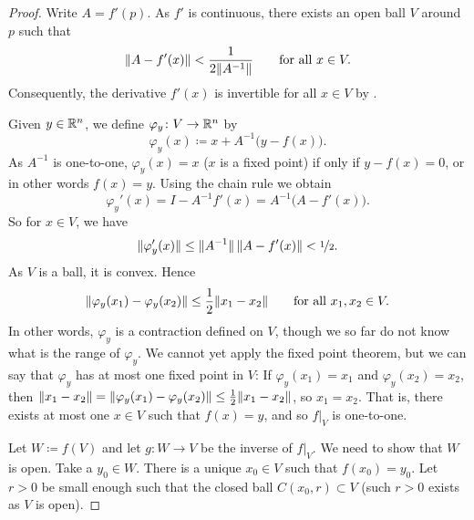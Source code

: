 \begin{proof}
Write $A = f'(p)$.  As $f'$ is continuous, there exists an open ball
$V$ around $p$ such that
\begin{equation*}
\lVert {A-f'(x)} \rVert < \frac{1}{2\lVert {A^{-1}} \rVert}
\qquad \text{for all } x \in V.
\end{equation*}
Consequently, the derivative $f'(x)$ is invertible for all $x \in V$
by .

Given $y \in {\mathbb{R}}^n$, we define $\varphi_y \colon V \to {\mathbb{R}}^n$ by
\begin{equation*}
\varphi_y (x) \coloneqq x + A^{-1}\bigl(y-f(x)\bigr) .
\end{equation*}
As $A^{-1}$ is one-to-one,
$\varphi_y(x) = x$ ($x$ is a fixed point) if only if
$y-f(x) = 0$, or in other words $f(x)=y$.  Using the chain rule we obtain
\begin{equation*}
\varphi_y'(x) = I - A^{-1} f'(x) = A^{-1} \bigl( A-f'(x) \bigr) .
\end{equation*}
So for $x \in V$, we have
\begin{equation*}
\lVert {\varphi_y'(x)} \rVert \leq \lVert {A^{-1}} \rVert \, \lVert {A-f'(x)} \rVert < \nicefrac{1}{2} .
\end{equation*}
As $V$ is a ball, it is convex.  Hence
\begin{equation*}
\lVert {\varphi_y(x_1)-\varphi_y(x_2)} \rVert \leq \frac{1}{2} \lVert {x_1-x_2} \rVert 
\qquad
\text{for all } x_1,x_2 \in V.
\end{equation*}
In other words, $\varphi_y$ is a contraction defined on $V$, though we so far
do not know what is the range of $\varphi_y$.  We cannot yet
apply the fixed
point theorem, but we can say that $\varphi_y$ 
has at most one fixed point in $V$:
If $\varphi_y(x_1) = x_1$ and
$\varphi_y(x_2) = x_2$, then
$\lVert {x_1-x_2} \rVert = \lVert {\varphi_y(x_1)-\varphi_y(x_2)} \rVert \leq
\frac{1}{2} \lVert {x_1-x_2} \rVert$, so $x_1 = x_2$.
That is, there exists at most one $x \in V$
such that $f(x) = y$, and so $f|_V$ is one-to-one.

Let $W \coloneqq f(V)$ and let $g \colon W \to V$ be the inverse of $f|_V$.
We need to show that $W$ is open.  Take a $y_0 \in W$.
There is a unique $x_0 \in V$ such that $f(x_0) = y_0$.
Let $r > 0$ be small enough such that the closed ball $C(x_0,r) \subset V$
(such $r > 0$ exists as $V$ is open).


\end{proof}
